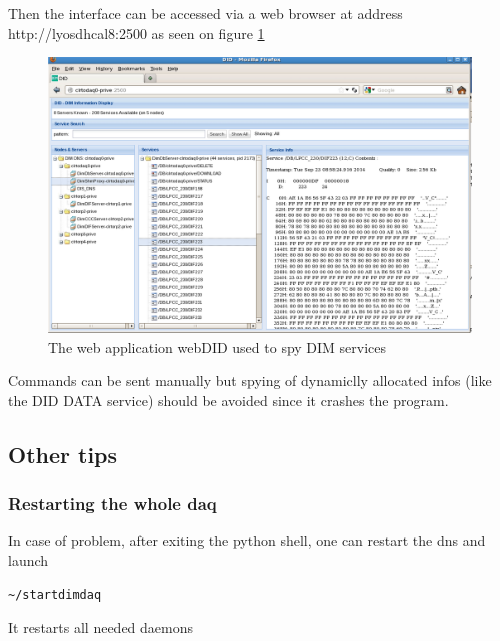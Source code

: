 \documentclass[english]{article}
\begin{document}
Then the interface can be accessed via a web browser at address http://lyosdhcal8:2500 as seen on figure \ref{webdid}
\begin{figure}[htp]
\centering
\includegraphics[width=1.3\textwidth]{./webDid.png}
\caption{The web application webDID used to spy DIM services}
\label{webdid}
\end{figure}

Commands can be sent manually but spying of dynamiclly allocated infos (like the DID DATA service) should be avoided since it crashes the program. 
\subsection{Other tips}
\subsubsection{Restarting the whole daq}
In case of problem, after exiting the python shell, one can restart the dns and launch
\begin{verbatim}
~/startdimdaq
\end{verbatim}
It restarts all needed daemons
\end{document}
